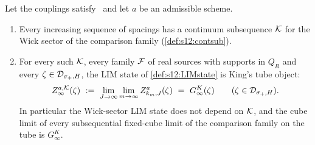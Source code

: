 \begin{proposition}\label{prop:s13:LIMK}
Let the couplings satisfy \Tthree\ and let $a$ be an admissible scheme.
\begin{enumerate}[label=\textup{(\alph*)},leftmargin=*,nosep]
\item Every increasing sequence of spacings has a continuum subsequence $\mathcal K$ for the Wick sector of the comparison family (\cref{def:s12:contsub}).
\item For every such $\mathcal K$, every family $\mathcal F$ of real sources with supports in $Q_R$ and every $\zeta\in\mathcal D_{\sigma_+,H}$, the LIM state of \cref{def:s12:LIMstate} is King's tube object:
\[
Z^{a,\cK}_\infty(\zeta)\ \defeq\ \lim_{J\to\infty}\lim_{m\to\infty}Z^a_{k_m,J}(\zeta)\ =\ G^K_\infty(\zeta)\qquad(\zeta\in\Dtube).
\]
In particular the Wick-sector LIM state does not depend on $\mathcal K$, and the cube limit of every subsequential fixed-cube limit of the comparison family on the tube is $G^K_\infty$.
\end{enumerate}
\end{proposition}

